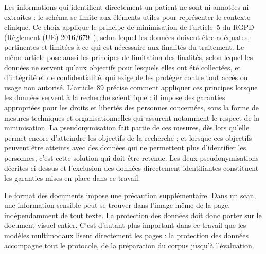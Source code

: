 Les informations qui identifient directement un patient ne sont ni annotées ni extraites : le schéma se limite aux éléments utiles pour représenter le contexte clinique. Ce choix applique le principe de minimisation de l'article~5 du RGPD (Règlement (UE) 2016/679~\cite{rgpd2016}), selon lequel les données doivent être adéquates, pertinentes et limitées à ce qui est nécessaire aux finalités du traitement. Le même article pose aussi les principes de limitation des finalités, selon lequel les données ne servent qu'aux objectifs pour lesquels elles ont été collectées, et d'intégrité et de confidentialité, qui exige de les protéger contre tout accès ou usage non autorisé. L'article~89 précise comment appliquer ces principes lorsque les données servent à la recherche scientifique : il impose des garanties appropriées pour les droits et libertés des personnes concernées, sous la forme de mesures techniques et organisationnelles qui assurent notamment le respect de la minimisation. La pseudonymisation fait partie de ces mesures, dès lors qu'elle permet encore d'atteindre les objectifs de la recherche ; et lorsque ces objectifs peuvent être atteints avec des données qui ne permettent plus d'identifier les personnes, c'est cette solution qui doit être retenue. Les deux pseudonymisations décrites ci-dessus et l'exclusion des données directement identifiantes constituent les garanties mises en place dans ce travail.

Le format des documents impose une précaution supplémentaire. Dans un scan, une information sensible peut se trouver dans l'image même de la page, indépendamment de tout texte. La protection des données doit donc porter sur le document visuel entier. C'est d'autant plus important dans ce travail que les modèles multimodaux lisent directement les pages : la protection des données accompagne tout le protocole, de la préparation du corpus jusqu'à l'évaluation.

